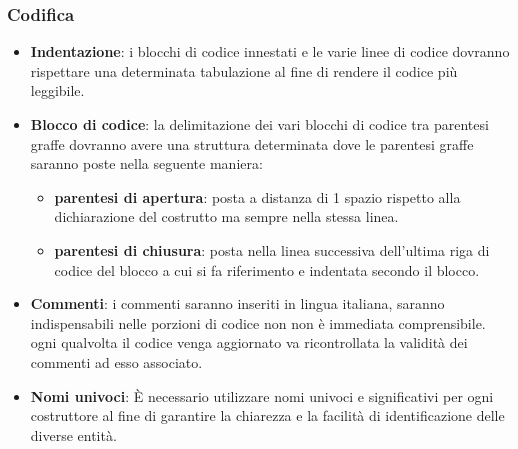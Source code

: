 \subsubsection{Codifica}
\begin{itemize}
    \item \textbf{Indentazione}: i blocchi di codice innestati e le varie linee di codice dovranno rispettare una determinata tabulazione al fine di rendere il codice più leggibile.
    \item \textbf{Blocco di codice}: la delimitazione dei vari blocchi di codice tra parentesi graffe dovranno avere una struttura determinata dove le parentesi 
    graffe saranno poste nella seguente maniera:
    \begin{itemize}
        \item \textbf{parentesi di apertura}: posta a distanza di 1 spazio rispetto alla dichiarazione del costrutto ma sempre nella stessa linea.
        \item \textbf{parentesi di chiusura}: posta nella linea successiva dell’ultima riga di codice del blocco a cui si fa riferimento e indentata secondo il blocco. 
    \end{itemize}
    \item \textbf{Commenti}: i commenti saranno inseriti in lingua italiana, saranno indispensabili nelle porzioni di codice non non è immediata comprensibile. ogni qualvolta il codice 
    venga aggiornato va ricontrollata la validità dei commenti ad esso associato.
    \item \textbf{Nomi univoci}: È necessario utilizzare nomi univoci e significativi per ogni costruttore al fine di garantire la chiarezza e la facilità di identificazione delle diverse entità.
\end{itemize}









